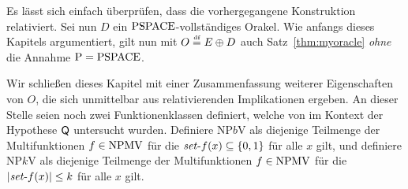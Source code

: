 Es lässt sich einfach überprüfen, dass die vorhergegangene Konstruktion relativiert.
Sei nun $D$ ein $\mathrm{PSPACE}$-vollständiges Orakel.
Wie anfangs dieses Kapitels argumentiert, gilt nun mit $O\stackrel{\text{\smash{\tiny df}}}{=} E\oplus D$ auch Satz~\ref{thm:myoracle} \emph{ohne} die Annahme $\mathrm{P}=\mathrm{PSPACE}$.

Wir schließen dieses Kapitel mit einer Zusammenfassung weiterer Eigenschaften von $O$, die sich unmittelbar aus relativierenden Implikationen ergeben.
An dieser Stelle seien noch zwei Funktionenklassen definiert, welche von \textcite{fenner_inverting_2003} im Kontext der Hypothese $\mathsf{Q}$ untersucht wurden. Definiere $\mathrm{NP}b\mathrm{V}$ als diejenige Teilmenge der Multifunktionen $f\in\mathrm{NPMV}$ für die $\mathit{set}\text{-}{f}(x)\subseteq\{0,1\}$ für alle $x$ gilt, 
und definiere $\mathrm{NP}k\mathrm{V}$ als diejenige Teilmenge der Multifunktionen $f\in\mathrm{NPMV}$ für die $|\mathit{set}\text{-}{f}(x)|\leq k$ für alle $x$ gilt.
